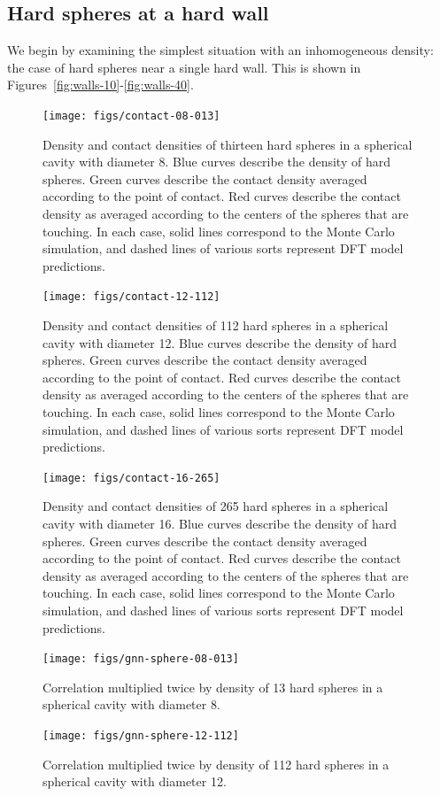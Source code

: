 \documentclass[letterpaper,twocolumn,amsmath,amssymb,jcp,10pt,aip]{revtex4-1}
\begin{document}
\subsection{Hard spheres at a hard wall}

We begin by examining the simplest situation with an inhomogeneous
density:  the case of hard spheres near a single hard wall.  This is
shown in Figures~\ref{fig:walls-10}-\ref{fig:walls-40}.



\newcommand\sphereExplanation{ Blue curves describe the density of
  hard spheres.  Green curves describe the contact density averaged
  according to the point of contact.  Red curves describe the contact
  density as averaged according to the centers of the spheres that are
  touching.  In each case, solid lines correspond to the Monte Carlo
  simulation, and dashed lines of various sorts represent DFT model
  predictions.}

\begin{figure}
  \texttt{[image: figs/contact-08-013]}
  \caption{Density and contact densities of thirteen hard spheres in a
    spherical cavity with diameter 8. \sphereExplanation }
  \label{fig:sphere-8}
\end{figure}

\begin{figure}
  \texttt{[image: figs/contact-12-112]}
  \caption{Density and contact densities of 112 hard spheres in a
    spherical cavity with diameter 12.  \sphereExplanation}
  \label{fig:sphere-12}
\end{figure}

\begin{figure}
  \texttt{[image: figs/contact-16-265]}
  \caption{Density and contact densities of 265 hard spheres in a
    spherical cavity with diameter 16. \sphereExplanation}
  \label{fig:sphere-16}
\end{figure}

\begin{figure}
  \texttt{[image: figs/gnn-sphere-08-013]}
  \caption{Correlation multiplied twice by density of 13 hard spheres in a
    spherical cavity with diameter 8.}
  \label{fig:gnn-sphere-08-013}
\end{figure}

\begin{figure}
  \texttt{[image: figs/gnn-sphere-12-112]}
  \caption{Correlation multiplied twice by density of 112 hard spheres in a
    spherical cavity with diameter 12.}
  \label{fig:gnn-sphere-12-112}
\end{figure}
\end{document}
